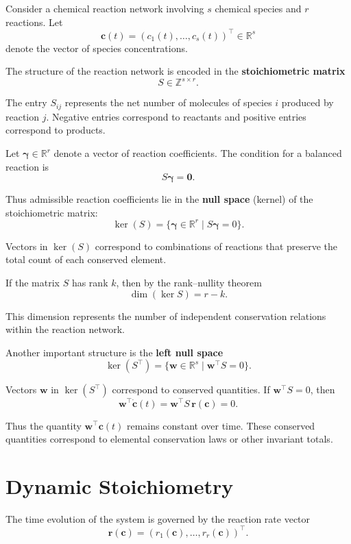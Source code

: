 \documentclass[11pt, openany]{book}
\theoremstyle{plain}
\theoremstyle{definition}
\theoremstyle{remark}
\begin{document}
Consider a chemical reaction network involving $s$ chemical species and
$r$ reactions. Let
\[
\mathbf{c}(t)=(c_1(t),\dots,c_s(t))^\top\in\mathbb{R}^s
\]
denote the vector of species concentrations.

The structure of the reaction network is encoded in the
\textbf{stoichiometric matrix}
\[
S\in\mathbb{Z}^{s\times r}.
\]

The entry $S_{ij}$ represents the net number of molecules of species $i$
produced by reaction $j$. Negative entries correspond to reactants and
positive entries correspond to products.

\medskip

Let $\boldsymbol{\gamma}\in\mathbb{R}^r$ denote a vector of reaction
coefficients. The condition for a balanced reaction is
\[
S\boldsymbol{\gamma}=\mathbf{0}.
\]

Thus admissible reaction coefficients lie in the
\textbf{null space} (kernel) of the stoichiometric matrix:
\[
\ker(S)
=
\{\boldsymbol{\gamma}\in\mathbb{R}^r\mid S\boldsymbol{\gamma}=0\}.
\]

Vectors in $\ker(S)$ correspond to combinations of reactions that
preserve the total count of each conserved element.

\medskip

If the matrix $S$ has rank $k$, then by the rank–nullity theorem
\[
\dim(\ker S)=r-k.
\]

This dimension represents the number of independent conservation
relations within the reaction network.

\medskip

Another important structure is the \textbf{left null space}
\[
\ker(S^\top)
=
\{\mathbf{w}\in\mathbb{R}^s\mid \mathbf{w}^\top S=0\}.
\]

Vectors $\mathbf{w}$ in $\ker(S^\top)$ correspond to conserved
quantities. If $\mathbf{w}^\top S=0$, then
\[
\mathbf{w}^\top\dot{\mathbf{c}}(t)
=
\mathbf{w}^\top S\,\mathbf{r}(\mathbf{c})
=
0.
\]

Thus the quantity $\mathbf{w}^\top\mathbf{c}(t)$ remains constant over
time. These conserved quantities correspond to elemental conservation
laws or other invariant totals.

\section{Dynamic Stoichiometry}

The time evolution of the system is governed by the reaction rate vector
\[
\mathbf{r}(\mathbf{c})
=
(r_1(\mathbf{c}),\dots,r_r(\mathbf{c}))^\top.
\]
\end{document}
